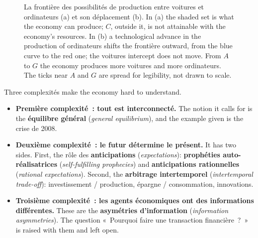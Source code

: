 \begin{figure}[h!]
  \caption*{\small La frontière des possibilités de production entre voitures et
  ordinateurs (a) et son déplacement (b). In (a) the shaded set is what the economy
  can produce; $C$, outside it, is not attainable with the economy's resources. In
  (b) a technological advance in the production of ordinateurs shifts the frontière
  outward, from the blue curve to the red one; the voitures intercept does not move.
  From $A$ to $G$ the economy produces more voitures and more ordinateurs. The ticks
  near $A$ and $G$ are spread for legibility, not drawn to scale.}
\end{figure}

Three complexités make the economy hard to understand.

\begin{itemize}
  \item \textbf{Première complexité~: tout est interconnecté.} The notion it calls
    for is the \textbf{équilibre général} (\textit{general equilibrium}), and the example
    given is the crise de 2008.
  \item \textbf{Deuxième complexité~: le futur détermine le présent.} It has two
    sides. First, the rôle des \textbf{anticipations} (\textit{expectations}):
    \textbf{prophéties auto-réalisatrices} (\textit{self-fulfilling prophecies})
    and \textbf{anticipations rationnelles} (\textit{rational expectations}).
    Second, the \textbf{arbitrage intertemporel} (\textit{intertemporal
    trade-off}): investissement / production, épargne / consommation,
    innovations.
  \item \textbf{Troisième complexité~: les agents économiques ont des informations
    différentes.} These are the \textbf{asymétries d'information}
    (\textit{information asymmetries}). The question «~Pourquoi faire une
    transaction financière~?~» is raised with them and left open.
\end{itemize}

